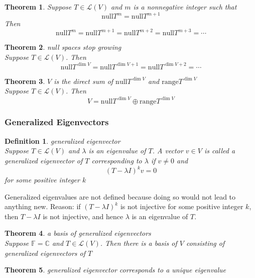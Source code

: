\documentclass{article}
\newtheorem{theorem}{Theorem}[subsection]
\newtheorem{definition}{Definition}[subsection]
\newcommand{\CC}{\mathbb{C}}
\newcommand{\FF}{\mathbb{F}}
\newcommand{\range}{\text{range}}
\newcommand{\n}{\text{null}}
\begin{document}
\begin{CJK}{UTF8}{gkai}
\begin{theorem}
    Suppose $T \in \mathcal{L}(V)$ and $m$ is a nonnegative integer such that
    \[\n T^m = \n T^{m+1}\]
    Then
    \[\n T^m = \n T^{m+1} = \n T^{m+2} = \n T^{m+3} = \cdots\]
\end{theorem}

\begin{theorem}
    null spaces stop growing\\

    Suppose $T \in \mathcal{L}(V)$. Then
    \[\n T^{ \dim V} = \n T^{ \dim V+1} = \n T^{\dim V+2} = \cdots\]
\end{theorem}

\begin{theorem}
    $V$ is the direct sum of $\n T^{ \dim V}$ and $\range T^{ \dim V}$\\

    Suppose $T \in \mathcal{L}(V)$. Then
    \[V =\n T^{ \dim V} \oplus \range T^{ \dim V}\]
\end{theorem}

\subsubsection{Generalized Eigenvectors}

\begin{definition}
    generalized eigenvector\\

    Suppose $T \in \mathcal{L}(V)$ and $\lambda$ is an eigenvalue of $T$. A vector $v \in V$ is called a generalized eigenvector of $T$ corresponding to $\lambda$ if $v \neq 0$ and
    \[(T - \lambda I)^k v = 0\]
    for some positive integer $k$
\end{definition}

Generalized eigenvalues are not defined because doing so would not lead to anything new. Reason: if $(T - \lambda I)^k$ is not injective for some positive integer $k$, then $T - \lambda I$ is not injective, and hence $\lambda$ is an eigenvalue of $T$.

\begin{theorem}
    a basis of generalized eigenvectors\\

    Suppose $\FF = \CC$ and $T \in \mathcal{L}(V)$. Then there is a basis of $V$ consisting of generalized eigenvectors of $T$
\end{theorem}

\begin{theorem}
    generalized eigenvector corresponds to a unique eigenvalue\\


\end{theorem}
\end{CJK}
\end{document}
